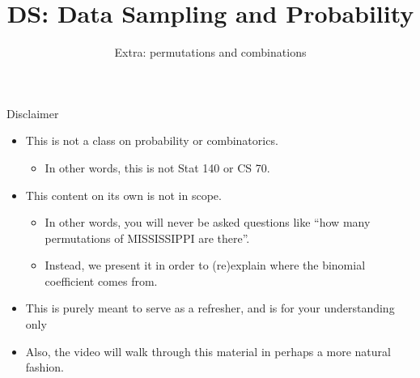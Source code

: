 \documentclass[aspectratio=169]{../latex_main/tntbeamer}  %
\title[Introduction]{DS: Data Sampling and Probability}
\subtitle{Extra: permutations and combinations}
\begin{document}
	
	\maketitle
	
	
	\begin{frame}{Disclaimer}
	    \begin{itemize}
	        \item This is not a class on probability or combinatorics. 
	        \begin{itemize}
	            \item In other words, this is not Stat 140 or CS 70.
	        \end{itemize}
	        \item This content on its own is not in scope.
	        \begin{itemize}
	            \item In other words, you will never be asked questions like “how many permutations of MISSISSIPPI are there”.
	            \item Instead, we present it in order to (re)explain where the binomial coefficient comes from.
	        \end{itemize}
	        \item This is purely meant to serve as a refresher, and is for your understanding only
	        \item Also, the video will walk through this material in perhaps a more natural fashion.
	    \end{itemize}
	\end{frame}
	
\end{document}
